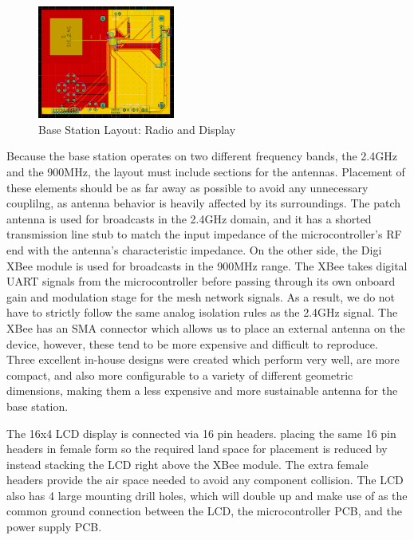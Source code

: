 \documentclass[journal,compsoc]{IEEEtran}
\begin{document}
\begin{figure}[ht] 	%
\centering
\includegraphics[width=0.4\textwidth]{base-layout-full.PNG}
\caption{ \space Base Station Layout: Radio and Display}
\label{base-lay-full}
\end{figure}

Because the base station operates on two different frequency bands, the 2.4GHz and the 900MHz, the layout must include sections for the antennas. Placement of these elements should be as far away as possible to avoid any unnecessary couplilng, as antenna behavior is heavily affected by its surroundings. The patch antenna is used for broadcasts in the 2.4GHz domain, and it has a shorted transmission line stub to match the input impedance of the microcontroller's RF end with the antenna's characteristic impedance. On the other side, the Digi XBee module is used for broadcasts in the 900MHz range. The XBee takes digital UART signals from the microcontroller before passing through its own onboard gain and modulation stage for the mesh network signals. As a result, we do not have to strictly follow the same analog isolation rules as the 2.4GHz signal. The XBee has an SMA connector which allows us to place an external antenna on the device, however, these tend to be more expensive and difficult to reproduce. Three excellent in-house designs were created which perform very well, are more compact, and also more configurable to a variety of different geometric dimensions, making them a less expensive and more sustainable antenna for the base station.

The 16x4 LCD display is connected via 16 pin headers. placing the same 16 pin headers in female form so the required land space for placement is reduced by instead stacking the LCD right above the XBee module. The extra female headers provide the air space needed to avoid any component collision. The LCD also has 4 large mounting drill holes, which will double up and make use of as the common ground connection between the LCD, the microcontroller PCB, and the power supply PCB.
\end{document}

